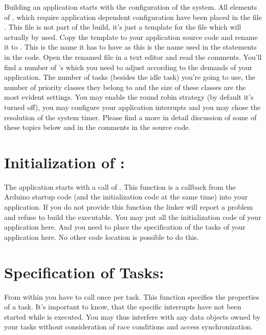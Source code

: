 Building an \rtos{} application starts with the configuration of the
system. All elements of \rtos{}, which require application dependent
configuration have been placed in the file .
This file is not part of the build, it's just a template for the file
which will actually by used. Copy the template to your application source
code and rename it to . This is the name it has to
have as this is the name used in the  statements in the
code. Open the renamed file in a text editor and read the comments. You'll
find a number of 's which you need to adjust according to
the demands of your application. The number of tasks (besides the idle
task) you're going to use, the number of priority classes they belong to
and the size of these classes are the most evident settings. You may
enable the round robin strategy (by default it's turned off), you may
configure your application interrupts and you may chose the resolution of
the system timer. Please find a more in detail discussion of some of these
topics below and in the comments in the source code.

\section{Initialization of \rtos: }

The \rtos{} application starts with a call of . This function
is a callback from the Arduino startup code (and the \rtos{} initialization
code at the same time) into your application. If you do not provide this
function the linker will report a problem and refuse to build the
executable. You may put all the initialization code of your application
here. And you need to place the specification of the tasks of your
application here. No other code location is possible to do this.


\section{Specification of Tasks: }

From within  you have to call 
once per task. This function specifies the properties of a task. It's
important to know, that the specific \rtos{} interrupts have not been
started while  is executed. You may thus interfere with any
data objects owned by your tasks without consideration of race conditions
and access synchronization.

